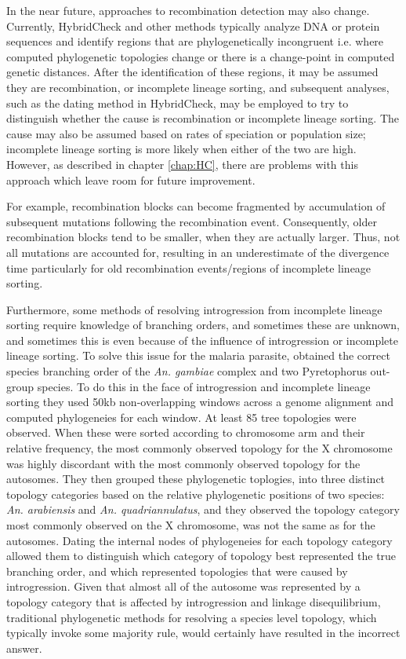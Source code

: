 In the near future, approaches to recombination detection may also change.
Currently, HybridCheck and other methods typically analyze DNA or protein sequences and identify regions that are phylogenetically incongruent i.e. where computed phylogenetic topologies change or there is a change-point in computed genetic distances.
After the identification of these regions, it may be assumed they are recombination, or incomplete lineage sorting, and subsequent analyses, such as the dating method in HybridCheck, may be employed to try to distinguish whether the cause is recombination or incomplete lineage sorting.
The cause may also be assumed based on rates of speciation or population size; incomplete lineage sorting is more likely when either of the two are high.
However, as described in chapter \ref{chap:HC}, there are problems with this approach which leave room for future improvement.

For example, recombination blocks can become fragmented by accumulation of subsequent mutations following the recombination event.
Consequently, older recombination blocks tend to be smaller, when they are actually larger.
Thus, not all mutations are accounted for, resulting in an underestimate of the divergence time particularly for old recombination events/regions of incomplete lineage sorting.

Furthermore, some methods of resolving introgression from incomplete lineage sorting require knowledge of branching orders, and sometimes these are unknown, and sometimes this is even because of the influence of introgression or incomplete lineage sorting.
To solve this issue for the malaria parasite, \cite{Neafsey2014} obtained the correct species branching order of the \textit{An. gambiae} complex and two Pyretophorus out-group species.
To do this in the face of introgression and incomplete lineage sorting they used 50kb non-overlapping windows across a genome alignment and computed phylogeneies for each window.
At least 85 tree topologies were observed.
When these were sorted according to chromosome arm and their relative frequency, the most commonly observed topology for the X chromosome was highly discordant with the most commonly observed topology for the autosomes.
They then grouped these phylogenetic toplogies, into three distinct topology categories based on the relative phylogenetic positions of two species: \textit{An. arabiensis} and \textit{An. quadriannulatus}, and they observed the topology category most commonly observed on the X chromosome, was not the same as for the autosomes. 
Dating the internal nodes of phylogeneies for each topology category allowed them to distinguish which category of topology best represented the true branching order, and which represented topologies that were caused by introgression.
Given that almost all of the autosome was represented by a topology category that is affected by introgression and linkage disequilibrium, traditional phylogenetic methods for resolving a species level topology, which typically invoke some majority rule, would certainly have resulted in the incorrect answer.

